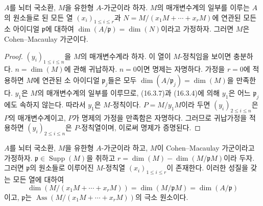 \begin{proposition}[16.5.8]
\label{0.16.5.8-fr}
$A$를 뇌터 국소환, $M$을 유한형 $A$-가군이라 하자. $M$의
매개변수계의 일부를 이루는 $A$의 원소들로 된 모든 열
$(x_i)_{1\leq i\leq r}$과
$N=M/(x_1M+\cdots+x_rM)$에 연관된 모든 소 아이디얼
$\mathfrak{p}$에 대하여 $\dim(A/\mathfrak{p})=\dim(N)$이라고
가정하자. 그러면 $M$은 Cohen--Macaulay 가군이다.
\end{proposition}

\begin{proof}
$(y_i)_{1\leq i\leq n}$을 $M$의 매개변수계라 하자. 이 열이
$M$-정칙임을 보이면 충분하다. $n=\dim(M)$에 관해 귀납하자.
$n=0$이면 명제는 자명하다. 가정을 $r=0$에 적용하면 $M$에 연관된
소 아이디얼 $\mathfrak{p}_j$들은 모두
$\dim(A/\mathfrak{p}_j)=\dim(M)$을 만족한다. $y_1$은 $M$의
매개변수계의 일부를
이루므로, (16.3.7)과 (16.3.4)에 의해 $y_1$은 어느
$\mathfrak{p}_j$에도 속하지 않는다. 따라서 $y_1$은 $M$-정칙이다.
$P=M/y_1M$이라 두면 $(y_i)_{2\leq i\leq n}$은 $P$의 매개변수계이고,
$P$가 명제의 가정을 만족함은 자명하다. 그러므로 귀납가정을 적용하면
$(y_i)_{2\leq i\leq n}$은 $P$-정칙열이며, 이로써 명제가 증명된다.
\end{proof}

\begin{proposition}[16.5.9]
\label{0.16.5.9-fr}
$A$를 뇌터 국소환, $M$을 유한형 $A$-가군이라 하고, $M$이
Cohen--Macaulay 가군이라고 가정하자.
$\mathfrak{p}\in\operatorname{Supp}(M)$을 취하고
$r=\dim(M)-\dim(M/\mathfrak{p}M)$이라 두자. 그러면
$\mathfrak{p}$의 원소들로 이루어진 $M$-정칙열
$(x_i)_{1\leq i\leq r}$이 존재한다. 이러한 성질을 갖는 모든 열에
대하여
\[
  \dim(M/(x_1M+\cdots+x_rM))
  =\dim(M/\mathfrak{p}M)=\dim(A/\mathfrak{p})
\]
이고, $\mathfrak{p}$는
$\operatorname{Ass}(M/(x_1M+\cdots+x_rM))$의 극소 원소이다.
\end{proposition}

